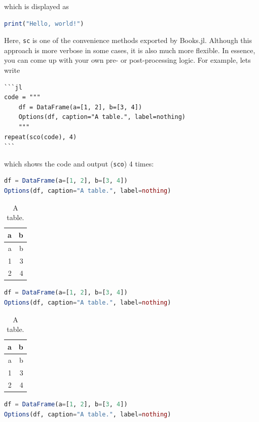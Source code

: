 \documentclass[
  notoc %
]{tufte-book}
\newcommand{\passthrough}[1]{#1}
\begin{document}
which is displayed as

\begin{lstlisting}[language=Julia]
print("Hello, world!")
\end{lstlisting}

Here, \passthrough{\lstinline!sc!} is one of the convenience methods
exported by Books.jl. Although this approach is more verbose in some
cases, it is also much more flexible. In essence, you can come up with
your own pre- or post-processing logic. For example, lets write

\begin{lstlisting}
```jl
code = """
    df = DataFrame(a=[1, 2], b=[3, 4])
    Options(df, caption="A table.", label=nothing)
    """
repeat(sco(code), 4)
```
\end{lstlisting}

which shows the code and output (\passthrough{\lstinline!sco!}) 4 times:

\begin{lstlisting}[language=Julia]
df = DataFrame(a=[1, 2], b=[3, 4])
Options(df, caption="A table.", label=nothing)
\end{lstlisting}

\begin{longtable}[]{@{}rr@{}}
\caption{A table.}\tabularnewline
\toprule
a & b \\
\midrule
\endfirsthead
\toprule
a & b \\
\midrule
\endhead
1 & 3 \\
2 & 4 \\
\bottomrule
\end{longtable}

\begin{lstlisting}[language=Julia]
df = DataFrame(a=[1, 2], b=[3, 4])
Options(df, caption="A table.", label=nothing)
\end{lstlisting}

\begin{longtable}[]{@{}rr@{}}
\caption{A table.}\tabularnewline
\toprule
a & b \\
\midrule
\endfirsthead
\toprule
a & b \\
\midrule
\endhead
1 & 3 \\
2 & 4 \\
\bottomrule
\end{longtable}

\begin{lstlisting}[language=Julia]
df = DataFrame(a=[1, 2], b=[3, 4])
Options(df, caption="A table.", label=nothing)
\end{lstlisting}
\end{document}

